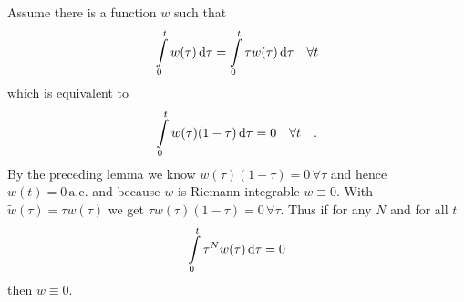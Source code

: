\begin{corollary}
Assume there is a function $w$ such that
\begin{equation}
\int\limits_0^t w(\tau) \,\text{d}  \tau = \int\limits_0^t \tau w(\tau) \,\text{d} \tau \quad 
\forall t
\end{equation}
which is equivalent to
\begin{equation}
\int\limits_0^t w(\tau)(1-\tau) \, \text{d} \tau = 0 \quad \forall t \quad .
\end{equation}
By the preceding lemma we know $w(\tau)(1-\tau)= 0 \, \forall \tau$ and hence 
$w(t)=0\,\text{a.e.}$ and because $w$ is Riemann integrable $w\equiv 0$. With 
$\tilde{w}(\tau) = \tau w(\tau)$ we get $\tau w(\tau)(1-\tau)=0\,\forall \tau$. Thus 
if for any $N$ and for all $t$
\begin{equation}
\int\limits_0^t \tau^N w(\tau) \,\text{d}\tau= 0
\end{equation}
then $w\equiv 0$.
\end{corollary}